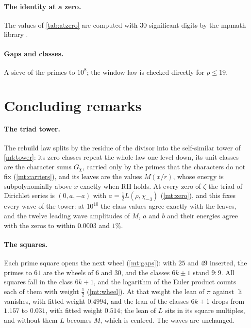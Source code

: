 \documentclass[11pt]{article}
\theoremstyle{definition}\newtheorem{definition}[theorem]{Definition}
\theoremstyle{remark}\newtheorem{remark}[theorem]{Remark}
\theoremstyle{definition}\newtheorem{axiom}{Axiom}
\newcommand{\li}{\operatorname{li}}\newcommand{\Tr}{\operatorname{Tr}}
\begin{document}
\paragraph{The identity at a zero.} The values of \cref{tab:atzero} are computed with $30$ significant digits by the mpmath library \cite{mpmath}.

\paragraph{Gaps and classes.} A sieve of the primes to $10^8$; the window law is checked directly for $p\le19$.

\section{Concluding remarks}\label{sec:concl}

\paragraph{The triad tower.} The rebuild law splits by the residue of the divisor into the self-similar tower of \cref{mt:tower}: its zero classes repeat the whole law one level down, its unit classes are the character sums $G_\chi$, carried only by the primes that the characters do not fix (\cref{mt:carriers}), and its leaves are the values $M(x/r)$, whose energy is subpolynomially above $x$ exactly when RH holds. At every zero of $\zeta$ the triad of Dirichlet series is $(0,a,-a)$ with $a=\frac12L(\rho,\chi_{-3})$ (\cref{mt:zero}), and this fixes every wave of the tower: at $10^{10}$ the class values agree exactly with the leaves, and the twelve leading wave amplitudes of $M$, $a$ and $b$ and their energies agree with the zeros to within $0.0003$ and $1\%$.

\paragraph{The squares.} Each prime square opens the next wheel (\cref{mt:gaps}): with $25$ and $49$ inserted, the primes to $61$ are the wheels of $6$ and $30$, and the classes $6k\pm1$ stand $9:9$. All squares fall in the class $6k+1$, and the logarithm of the Euler product counts each of them with weight $\frac12$ (\cref{mt:wheel}). At that weight the lean of $\pi$ against $\li$ vanishes, with fitted weight $0.4994$, and the lean of the classes $6k\pm1$ drops from $1.157$ to $0.031$, with fitted weight $0.514$; the lean of $L$ sits in its square multiples, and without them $L$ becomes $M$, which is centred. The waves are unchanged.
\end{document}
